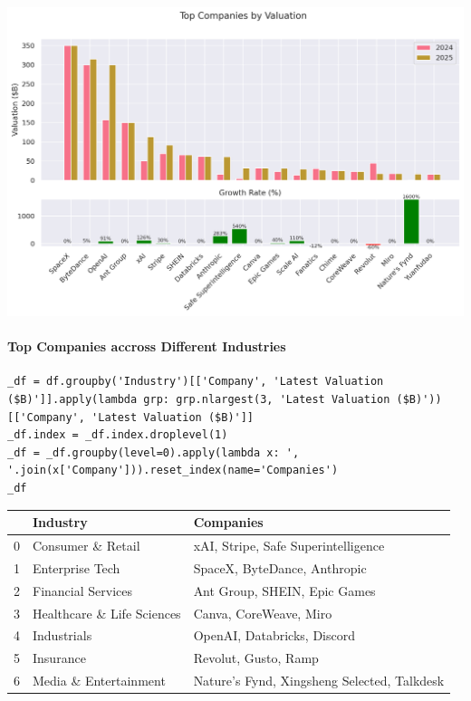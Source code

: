 \documentclass[a4paper,12pt]{article}
\begin{document}
\begin{center}
\includegraphics[width=.9\linewidth]{./.ob-jupyter/e5280d601c8b3020651869b90202313e8f489129.png}
\label{}
\end{center}
\paragraph{Top Companies accross Different Industries}
\label{sec:org555435e}

\begin{verbatim}
_df = df.groupby('Industry')[['Company', 'Latest Valuation ($B)']].apply(lambda grp: grp.nlargest(3, 'Latest Valuation ($B)'))[['Company', 'Latest Valuation ($B)']]
_df.index = _df.index.droplevel(1)
_df = _df.groupby(level=0).apply(lambda x: ', '.join(x['Company'])).reset_index(name='Companies')
_df
\end{verbatim}

\begin{table}[htbp]
\label{}
\centering
\begin{tabular}{rll}
 & Industry & Companies\\
\hline
0 & Consumer \& Retail & xAI, Stripe, Safe Superintelligence\\
1 & Enterprise Tech & SpaceX, ByteDance, Anthropic\\
2 & Financial Services & Ant Group, SHEIN, Epic Games\\
3 & Healthcare \& Life Sciences & Canva, CoreWeave, Miro\\
4 & Industrials & OpenAI, Databricks, Discord\\
5 & Insurance & Revolut, Gusto, Ramp\\
6 & Media \& Entertainment & Nature's Fynd, Xingsheng Selected, Talkdesk\\
\end{tabular}
\end{table}
\end{document}
